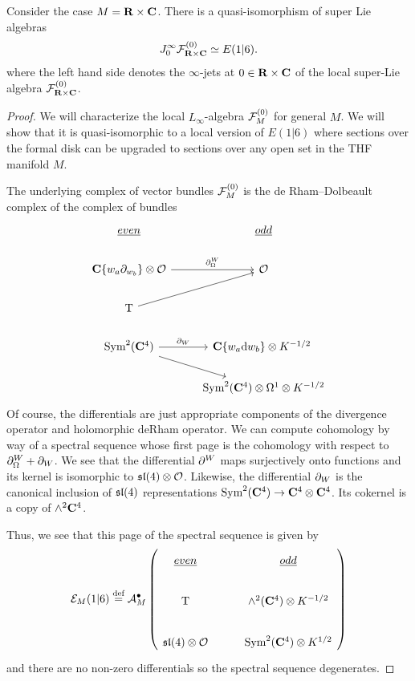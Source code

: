 \documentclass[../main.tex]{subfiles}
\begin{document}
\begin{prop}
Consider the case $M = \mathbf{R} \times \mathbf{C}$.
There is a quasi-isomorphism of super Lie algebras
\[
J^\infty_0\mathcal{F}^{(0)}_{\mathbf{R}\times \mathbf{C}} \simeq E(1|6).
\]
where the left hand side denotes the $\infty$-jets at $0\in \mathbf{R}\times \mathbf{C}$ of the local super-Lie algebra $\mathcal{F}^{(0)}_{\mathbf{R}\times \mathbf{C}}$. 
\end{prop}
\begin{proof}
We will characterize the local $L_\infty$-algebra $\mathcal{F}^{(0)}_{M}$ for general $M$. 
We will show that it is quasi-isomorphic to a local version of $E(1|6)$ where sections over the formal disk can be upgraded to sections over any open set in the THF manifold $M$.

The underlying complex of vector bundles $\mathcal{F}^{(0)}_{M}$ is the de Rham--Dolbeault complex of the complex of bundles 
\begin{equation}
\begin{tikzcd}
\ul{even} & \ul{odd} \\
\C\{w_a\del_{w_b}\}\otimes \mc O\ar[r, "\del^W_\Omega"]  & \mc O \\ 
\T \ar[ur] & \\
\Sym^2 (\C^4)\ar[r, "\del_W"]\ar[dr] & \C\{w_a\d w_b\} \otimes K^{-1/2}\ \\
& \Sym^2 (\C^4)\otimes \Omega^1\otimes K^{-1/2}
\end{tikzcd}
\end{equation}
Of course, the differentials are just appropriate components of the divergence operator and holomorphic deRham operator. We can compute cohomology by way of a spectral sequence whose first page is the cohomology with respect to $\partial^W_\Omega + \partial_W$. We see that the differential $\partial^W$ maps surjectively onto functions and its kernel is isomorphic to $\mathfrak{sl}(4)\otimes \mathcal{O}$. Likewise, the differential $\partial_W$ is the canonical inclusion of $\mathfrak{sl}(4)$ representations $\text{Sym}^2 (\mathbf{C}^4)\to \mathbf{C}^4\otimes \mathbf{C}^4$. 
Its cokernel is a copy of $\wedge^2 \mathbf{C}^4$. 

Thus, we see that this page of the spectral sequence is given by
\begin{equation}
\mc E_M(1|6) \define \cA^\bu_M \left (
\begin{tikzcd}
\ul{even} & \ul{odd} \\
\T & \wedge^2 (\C^4) \otimes K^{-1/2} \\
\mf {sl}(4)\otimes \mc O & \Sym^2 (\C^4)\otimes K^{1/2}
\end{tikzcd} \right)
\end{equation}
and there are no non-zero differentials so the spectral sequence degenerates.


\end{proof}
\end{document}

